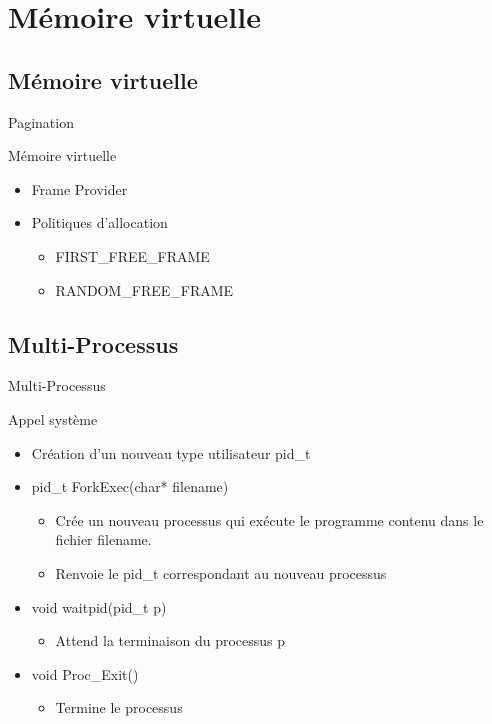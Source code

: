 \documentclass{beamer}
\begin{document}
\section{Mémoire virtuelle}
\subsection{Mémoire virtuelle}
\begin{frame}{Pagination}
	\begin{block}{Mémoire virtuelle}
		\begin{itemize}[<+->]
			\item Frame Provider
			\item Politiques d'allocation
			\begin{itemize}
				\item FIRST\_FREE\_FRAME
				\item RANDOM\_FREE\_FRAME			
			\end{itemize}
		\end{itemize}
	\end{block}
\end{frame}
\subsection{Multi-Processus}

\begin{frame}{Multi-Processus}
	\begin{block}{Appel système}
		\begin{itemize}[<+->]
			\item Création d'un nouveau type utilisateur pid\_t
			\item pid\_t ForkExec(char* filename)
			\begin{itemize}
				\item<1-> Crée un nouveau processus qui exécute le programme contenu dans le fichier filename.
				\item<2-> Renvoie le pid\_t correspondant au nouveau processus
			\end{itemize}
			\item void waitpid(pid\_t p)
			\begin{itemize}
				\item<1-> Attend la terminaison du processus p
			\end{itemize}
			\item void Proc\_Exit()
			\begin{itemize}
				\item<1-> Termine le processus
			\end{itemize}			
		\end{itemize}
	\end{block}
\end{frame}
\end{document}
